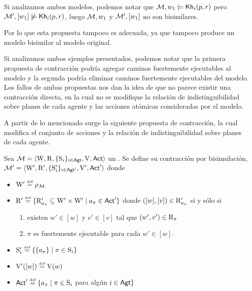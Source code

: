 Si analizamos ambos modelos, podemos notar que $\mathcal{M},w_1 \models \mathsf{Kh}_i(p,r)$ pero $\mathcal{M}',[w_1] \not\models \mathsf{Kh}_i(p,r)$, luego 
$\mathcal{M},w_1$ y $\mathcal{M}',[w_1]$ no son bisimilares.

Por lo que esta propuesta tampoco es adecuada, ya que tampoco produce un modelo bisimilar al modelo original.

Si analizamos ambos ejemplos presentados, podemos notar que la primera propuesta de contracción podría agregar caminos fuertemente ejecutables al modelo 
y la segunda podría eliminar caminos fuertemente ejecutables del modelo. Los fallos de ambas propuestas nos dan la idea de que no parece 
existir una contracción directa, en la cual no se modifique la relación de indistinguibilidad sobre planes de cada agente y las acciones 
atómicas consideradas por el modelo. 

A partir de lo mencionado surge la siguiente propuesta de contracción, la cual modifica el conjunto de acciones y la relación de indistinguibilidad 
sobre planes de cada agente.


\begin{definicion}
    Sea $\mathcal{M}=\langle \mathrm{W},\mathrm{R},\{ \mathrm{S}_i \}_{i \in {\rm \sf Agt}},\mathrm{V},{\rm \sf Act} \rangle$ un \ults. Se define su contracción por bisimulación, $\mathcal{M}'=\langle \mathrm{W}',\mathrm{R}',\{ \mathrm{S}_i' \}_{i \in {\rm \sf Agt}'},\mathrm{V}',{\rm \sf Act}' \rangle$ donde 
    \begin{center}
        \begin{itemize}
            \item $\W' \eqdef \rho_\model$
            \item $\R' \eqdef \{\R'_{a_\pi} \subseteq \W' \times \W' \mid a_\pi \in \ACT'\}$ donde $([w],[v]) \in \mathrm{R}'_{a_\pi}$ si y sólo si
            \begin{enumerate}
                \item existen $w' \in [w]$ y $v' \in [v]$ tal que $(w',v')\in \mathrm{R}_\pi$
                \item $\pi$ es fuertemente ejecutable para cada $w' \in [w]$.
            \end{enumerate}
            \item $\S_i' \eqdef \{ \{a_\pi\} \mid \pi \in \S_i \}$
            \item $\V'([w]) \eqdef \V(w)$
            \item $\ACT' \eqdef \{a_\pi \mid \pi\in \S_i$ para algún $i \in {\rm \sf Agt} \}$ 
        \end{itemize}
    \end{center}
\end{definicion}
    
